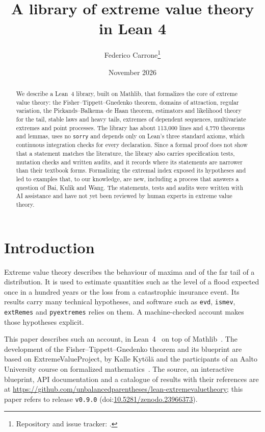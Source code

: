 \documentclass[11pt]{article}
\title{A library of extreme value theory in Lean 4}
\author{Federico Carrone\thanks{Repository and issue tracker: \repo.}}
\date{November 2026}
\newcommand{\repo}{\url{https://github.com/unbalancedparentheses/lean-extremevaluetheory}}
\newcommand{\release}{\texttt{v0.9.0}}
\newcommand{\doi}{doi:\href{https://doi.org/10.5281/zenodo.23966373}{10.5281/zenodo.23966373}}
\begin{document}
\sloppy
\maketitle

\begin{abstract}
We describe a Lean~4 library, built on Mathlib, that formalizes the core of extreme value theory:
the Fisher--Tippett--Gnedenko theorem, domains of attraction, regular variation, the
Pickands--Balkema--de Haan theorem, estimators and likelihood theory for the tail, stable laws and
heavy tails, extremes of dependent sequences, multivariate extremes and point processes. The library
has about 113,000 lines and 4,770 theorems and lemmas, uses no \texttt{sorry} and depends only on Lean's three standard
axioms, which continuous integration checks for every declaration. Since a formal proof does not
show that a statement matches the literature, the library also carries specification tests, mutation
checks and written audits, and it records where its statements are narrower than their textbook forms.
Formalizing the extremal index exposed its hypotheses and led to examples that, to our knowledge, are
new, including a process that answers a question of Bai, Kulik and Wang. The statements, tests and
audits were written with AI assistance and have not yet been reviewed by human experts in extreme value theory.
\end{abstract}

\section{Introduction}

Extreme value theory describes the behaviour of maxima and of the far tail of a distribution. It is
used to estimate quantities such as the level of a flood expected once in a hundred years or the loss
from a catastrophic insurance event. Its results carry many technical hypotheses, and
software such as \texttt{evd}, \texttt{ismev}, \texttt{extRemes} and \texttt{pyextremes} relies on them.
A machine-checked account makes those hypotheses explicit.

This paper describes such an account, in Lean~4~\cite{lean4} on top of Mathlib~\cite{mathlib}. The
development of the Fisher--Tippett--Gnedenko theorem and its blueprint are based on
ExtremeValueProject, by Kalle Kytölä and the participants of an Aalto University course on formalized
mathematics~\cite{evp}. The source, an interactive blueprint, API documentation and a catalogue of
results with their references are at \repo; this paper refers to release \release{} (\doi).
\end{document}
